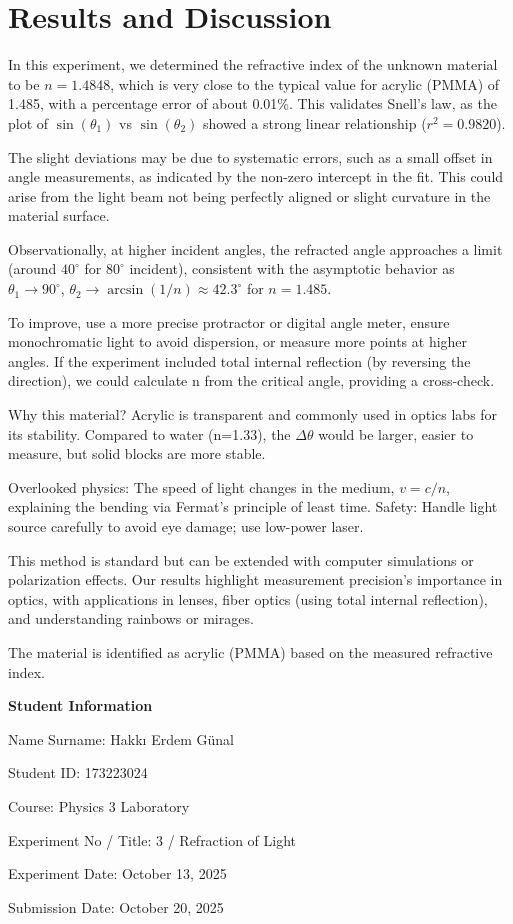 \documentclass[12pt, a4paper]{article}
\begin{document}
\section{Results and Discussion}
In this experiment, we determined the refractive index of the unknown material to be $n = 1.4848$, which is very close to the typical value for acrylic (PMMA) of 1.485, with a percentage error of about 0.01\%. This validates Snell's law, as the plot of $\sin(\theta_1)$ vs $\sin(\theta_2)$ showed a strong linear relationship ($r^2 = 0.9820$).

The slight deviations may be due to systematic errors, such as a small offset in angle measurements, as indicated by the non-zero intercept in the fit. This could arise from the light beam not being perfectly aligned or slight curvature in the material surface.

Observationally, at higher incident angles, the refracted angle approaches a limit (around $40^\circ$ for $80^\circ$ incident), consistent with the asymptotic behavior as $\theta_1 \to 90^\circ$, $\theta_2 \to \arcsin(1/n) \approx 42.3^\circ$ for $n=1.485$.

To improve, use a more precise protractor or digital angle meter, ensure monochromatic light to avoid dispersion, or measure more points at higher angles. If the experiment included total internal reflection (by reversing the direction), we could calculate n from the critical angle, providing a cross-check.

Why this material? Acrylic is transparent and commonly used in optics labs for its stability. Compared to water (n=1.33), the $\Delta \theta$ would be larger, easier to measure, but solid blocks are more stable.

Overlooked physics: The speed of light changes in the medium, $v = c/n$, explaining the bending via Fermat's principle of least time. Safety: Handle light source carefully to avoid eye damage; use low-power laser.

This method is standard but can be extended with computer simulations or polarization effects. Our results highlight measurement precision's importance in optics, with applications in lenses, fiber optics (using total internal reflection), and understanding rainbows or mirages.

The material is identified as acrylic (PMMA) based on the measured refractive index.

\newpage

\textbf{Student Information}

Name Surname: Hakkı Erdem Günal

Student ID: 173223024

Course: Physics 3 Laboratory

Experiment No / Title: 3 / Refraction of Light

Experiment Date: October 13, 2025

Submission Date: October 20, 2025
\end{document}
